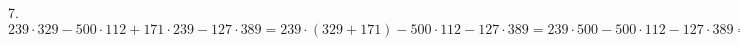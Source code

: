 7. $239\cdot329-500\cdot112+171\cdot239-127\cdot389=239\cdot(329+171)-500\cdot112-127\cdot389=239\cdot500-500\cdot112-127\cdot389=500\cdot(239-112)-127\cdot389=
500\cdot127-127\cdot389=127\cdot(500-389)=127\cdot111=14097.$\\
